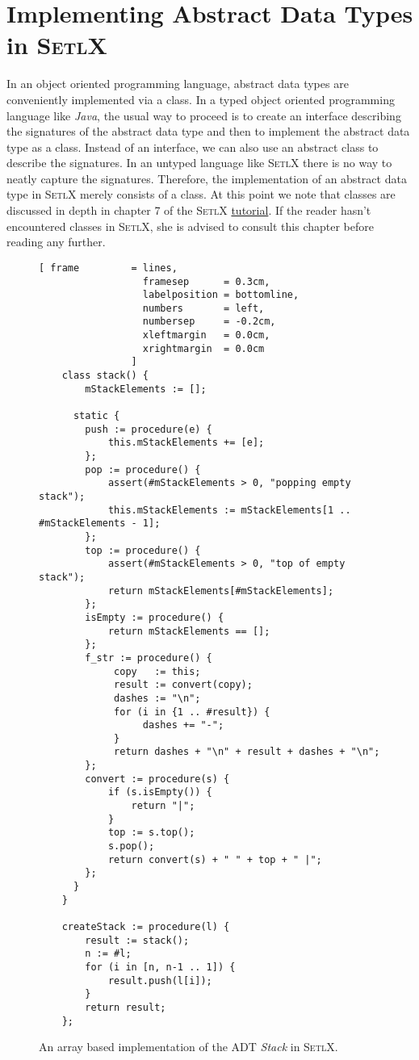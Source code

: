 \section[Implementation]{Implementing Abstract Data Types in \textsc{SetlX}}
In an object oriented programming language, abstract data types are conveniently implemented via a
class.  In a typed object oriented programming language like \textsl{Java}, the usual way to proceed
is to create an interface describing the signatures of the abstract data type and then to implement
the abstract data type as a class.  Instead of an interface, we can also use an abstract class
to describe the signatures.  In an untyped language like \textsc{SetlX} there is no way to
neatly capture the signatures.  Therefore, the implementation of an abstract data type in
\textsc{SetlX} merely consists of a class.
At this point we note that classes are discussed in depth in chapter 7 of the \textsc{SetlX} 
\href{http://wwwlehre.dhbw-stuttgart.de/~stroetma/SetlX/tutorial.pdf}{tutorial}.  If the reader
hasn't encountered classes in \textsc{SetlX}, she is advised to consult this chapter before reading
any further. 

\begin{figure}[!h]
  \centering
\begin{Verbatim}[ frame         = lines, 
                  framesep      = 0.3cm, 
                  labelposition = bottomline,
                  numbers       = left,
                  numbersep     = -0.2cm,
                  xleftmargin   = 0.0cm,
                  xrightmargin  = 0.0cm
                ]
    class stack() {
        mStackElements := [];
    
      static {  
        push := procedure(e) {
            this.mStackElements += [e];
        };
        pop := procedure() {
            assert(#mStackElements > 0, "popping empty stack");
            this.mStackElements := mStackElements[1 .. #mStackElements - 1];
        };
        top := procedure() {
            assert(#mStackElements > 0, "top of empty stack");
            return mStackElements[#mStackElements];
        };
        isEmpty := procedure() {
            return mStackElements == [];
        };
        f_str := procedure() {
             copy   := this;
             result := convert(copy);
             dashes := "\n";
             for (i in {1 .. #result}) {
                  dashes += "-";
             }
             return dashes + "\n" + result + dashes + "\n";
        };
        convert := procedure(s) {
            if (s.isEmpty()) {
                return "|";
            } 
            top := s.top();
            s.pop();
            return convert(s) + " " + top + " |";
        };
      }
    }
    
    createStack := procedure(l) {
        result := stack();
        n := #l;
        for (i in [n, n-1 .. 1]) {
            result.push(l[i]);
        }
        return result;
    };
\end{Verbatim}
\vspace*{-0.3cm}
  \caption{An array based implementation of the ADT \textsl{Stack} in \textsc{SetlX}.}
  \label{fig:stack-array.stlx}
\end{figure} 


